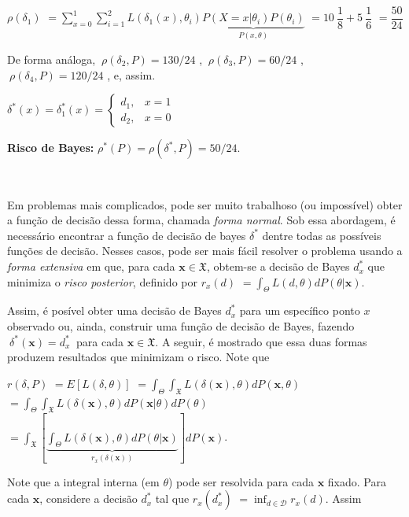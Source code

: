 \documentclass[
]{book}
\begin{document}
\(\rho(\delta_1)\) \(=\displaystyle \sum_{x=0}^1\sum_{i=1}^2L(\delta_1(x),\theta_i)\underbrace{P(X=x|\theta_i)P(\theta_i)}_{P(x,\theta)}\) \(=10~\dfrac{1}{8}+5~\dfrac{1}{6}\) \(=\dfrac{50}{24}\)

De forma análoga, \(~\rho(\delta_2,P)=130/24\) , \(~\rho(\delta_3,P)=60/24\) , \(~\rho(\delta_4,P)=120/24\) , e, assim.

\({\delta}^*(x)={\delta}^*_1(x)=\left\{\begin{array}{rl} d_1, & x=1\\ d_2, & x=0\end{array}\right.\)

\textbf{Risco de Bayes:} \(\rho^*(P)=\rho({\delta}^*,P)=50/24\).

\(~\)

Em problemas mais complicados, pode ser muito trabalhoso (ou impossível) obter a função de decisão dessa forma, chamada \emph{forma normal}. Sob essa abordagem, é necessário encontrar a função de decisão de bayes \({\delta}^*\) dentre todas as possíveis funções de decisão. Nesses casos, pode ser mais fácil resolver o problema usando a \emph{forma extensiva} em que, para cada \(\boldsymbol x \in \mathfrak{X}\), obtem-se a decisão de Bayes \({d}_{x}^*\) que minimiza o \emph{risco posterior}, definido por \(r_x(d)\) \(= \displaystyle \int_\Theta L(d,\theta) dP(\theta|\boldsymbol x)\).

Assim, é posível obter uma decisão de Bayes \({d}_x^*\) para um específico ponto \(x\) observado ou, ainda, construir uma função de decisão de Bayes, fazendo \(~{\delta}^*(\boldsymbol x) = {d}_x^*~\) para cada \(\boldsymbol x \in \mathfrak{X}\). A seguir, é mostrado que essa duas formas produzem resultados que minimizam o risco. Note que

\(r(\delta,P)\) \(=E\left[L\left(\delta,\theta\right)\right]\) \(=\displaystyle \int_\Theta \int_{\mathfrak{X}} L\left(\delta(\boldsymbol x),\theta\right) dP(\boldsymbol x,\theta)\) \(=\displaystyle \int_\Theta \int_{\mathfrak{X}} L\left(\delta(\boldsymbol x),\theta\right) dP(\boldsymbol x|\theta)dP(\theta)\) \(=\displaystyle \int_{\mathfrak{X}} \left[ \underbrace{\int_\Theta L\left(\delta(\boldsymbol x),\theta\right) dP(\theta|\boldsymbol x)}_{r_x\left(\delta(\boldsymbol x)\right)} \right]dP(\boldsymbol x)\).

Note que a integral interna (em \(\theta\)) pode ser resolvida para cada \(\boldsymbol x\) fixado. Para cada \(\boldsymbol x\), considere a decisão \({d}_x^*\) tal que \(r_x\left({d}_x^*\right)\) \(=\displaystyle \inf_{d \in \mathcal{D}} r_x(d)\). Assim
\end{document}
